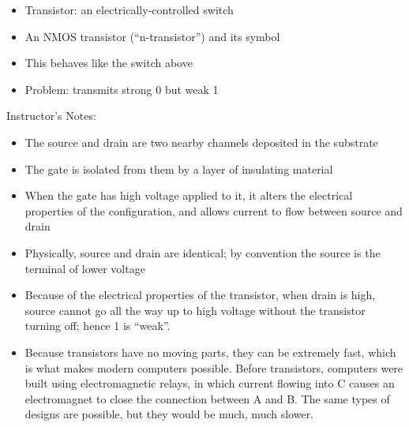 \begin{frame}[fragile]
\begin{itemize}
\item Transistor: an electrically-controlled switch


\item An NMOS transistor (``n-transistor'') and its symbol


\item This behaves like the switch above
\item Problem: transmits strong 0 but weak 1
\end{itemize}
\end{frame}
\BNotes\ifnum{}
\begin{frame}[fragile]
Instructor's Notes:
\begin{itemize}
\item The source and drain are two nearby channels deposited in the substrate
\item The gate is isolated from them by a layer of insulating material
\item When the gate has high voltage applied to it, it alters the electrical properties of the configuration, and allows current to flow between source and drain
\item Physically, source and drain are identical; by convention the source is the terminal of lower voltage
\item Because of the electrical properties of the transistor, when drain is high, source cannot go all the way up to high voltage without the transistor turning off; hence 1 is ``weak''.
\item Because transistors have no moving
parts, they can be extremely fast, which is what makes modern
computers possible. Before transistors, computers were built using
electromagnetic relays, in which current flowing into C causes an
electromagnet to close the connection between A and B. The same types
of designs are possible, but they would be much, much slower.

\end{itemize}
\end{frame}
\fi\ENotes



